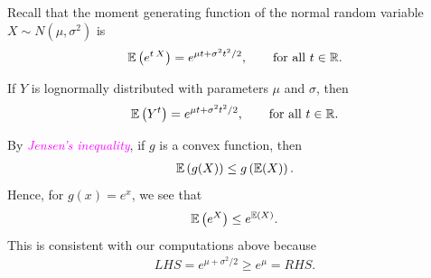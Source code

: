 \begin{frame}[fragile,t]
	Recall that the moment generating function of the normal random variable $X\sim
	N(\mu,\sigma^2)$ is
	\begin{align}
		\label{E:MomentGen}
		\mathbb{E}\left(e^{t\: X}\right) = e^{\mu t+\sigma^2 t^2/2}, \qquad \text{for all $t\in\mathbb{R}$.}
	\end{align}
	\bigskip
	\begin{remark}
		If $Y$ is lognormally distributed with parameters $\mu$ and $\sigma$, then
		\begin{align*}
			\mathbb{E}\left(Y^t\right) =  e^{\mu t+\sigma^2 t^2/2}, \qquad \text{for all $t\in\mathbb{R}$.}
		\end{align*}
	\end{remark}
	\bigskip
	\begin{remark}
		By \textcolor{magenta}{\it Jensen's inequality}, if $g$ is a convex function, then
		\begin{align*}
			\mathbb{E}\left(g(X)\right) \le g\left(\mathbb{E}(X)\right).
		\end{align*}
		Hence, for $g(x)=e^x$, we see that
		\begin{align*}
			\mathbb{E}\left(e^X\right) \le e^{\mathbb{E}(X)}.
		\end{align*}
		This is consistent with our computations above because
		\begin{align*}
			LHS=e^{\mu+\sigma^2/2} \ge e^{\mu} = RHS.
		\end{align*}
	\end{remark}
\end{frame}
